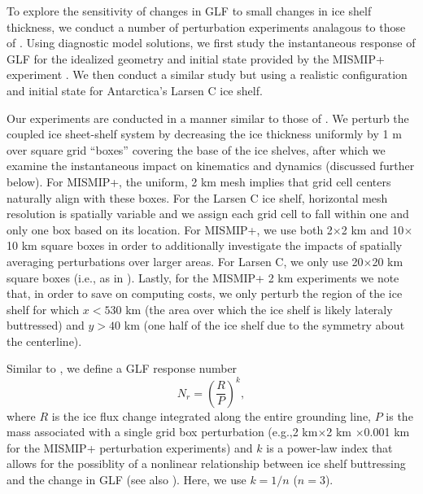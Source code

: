 \documentclass[review,oneside]{igs}
\begin{document}
To explore the sensitivity of changes in GLF to small changes in ice shelf thickness, we conduct a number of perturbation experiments analagous to those of \citet{reese2018}. Using diagnostic model solutions, we first study the instantaneous response of GLF for the idealized geometry and initial state provided by the MISMIP+ experiment \citep{asay2016}. We then conduct a similar study but using a realistic configuration and initial state for Antarctica's Larsen C ice shelf. %

Our experiments are conducted in a manner similar to those of \cite{reese2018}. We perturb the coupled ice sheet-shelf system by decreasing the ice thickness uniformly by 1 m over square grid ``boxes'' covering the base of the ice shelves, after which we examine the instantaneous impact on kinematics and dynamics (discussed further below). For MISMIP+, the uniform, 2 km mesh implies that grid cell centers naturally align with these boxes. For the Larsen C ice shelf, horizontal mesh resolution is spatially variable and we assign each grid cell to fall within one and only one box based on its location. For MISMIP+, we use both 2$\times$2 km and 10$\times$10 km square boxes in order to additionally investigate the impacts of spatially averaging perturbations over larger areas. For Larsen C, we only use 20$\times$20 km square boxes (i.e., as in \citet{reese2018}). Lastly, for the MISMIP+ 2 km experiments we note that, in order to save on computing costs, we only perturb the region of the ice shelf for which $x<530$ km (the area over which the ice shelf is likely lateraly buttressed) and $y>40$ km (one half of the ice shelf due to the symmetry about the centerline).

Similar to \cite{reese2018}, we define a GLF response number
\begin{equation}
N_r = \left(\frac{R}{P}\right)^k,
\end{equation}
where $R$ is the ice flux change integrated along the entire grounding line, $P$ is the mass associated with a single grid box perturbation (e.g.,2 km$\times$2 km $\times$0.001 km for the MISMIP+ perturbation experiments) and $k$ is a power-law index that allows for the possiblity of a nonlinear relationship between ice shelf buttressing and the change in GLF (see also \cite{schoof2007}). Here, we use $k=1/n$ ($n=3$).
\end{document}
